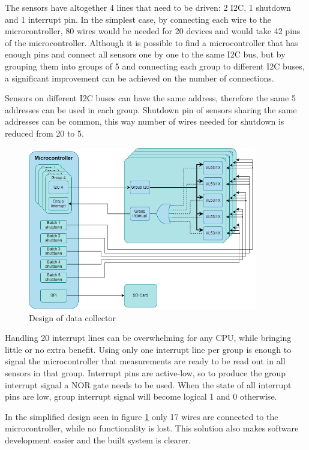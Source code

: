 The sensors have altogether 4 lines that need to be driven: 2 I2C, 1 shutdown and 1 interrupt pin.
In the simplest case, by connecting each wire to the microcontroller, 80 wires would be needed for 
20 devices and would take 42 pins of the microcontroller. Although it is possible to find a microcontroller 
that has enough pins and connect all sensors one by one to the same I2C bus, but by grouping them 
into groups of 5 and connecting each group to different I2C buses, a significant improvement can be 
achieved on the number of connections. 

Sensors on different I2C buses can have the same address, therefore the same 5 addresses can be used
in each group. Shutdown pin of sensors sharing the same addresses can be common, this way number of
wires needed for shutdown is reduced from 20 to 5.

\begin{figure}[ht]
    \centering
    \includegraphics[width=100mm, keepaspectratio]{figures/data_collector.png}
    \caption{Design of data collector}
    \label{fig:data_collector}
\end{figure}

Handling 20 interrupt lines can be overwhelming for any CPU, while bringing little or no extra
benefit. Using only one interrupt line per group is enough to signal the microcontroller that 
measurements are ready to be read out in all sensors in that group. Interrupt pins are active-low,
so to produce the group interrupt signal a NOR gate needs to be used. When the state of all interrupt
pins are low, group interrupt signal will become logical 1 and 0 otherwise.

In the simplified design seen in figure \ref{fig:data_collector} only 17 wires are connected to
the microcontroller, while no functionality is lost. This solution also makes software development
easier and the built system is clearer.




